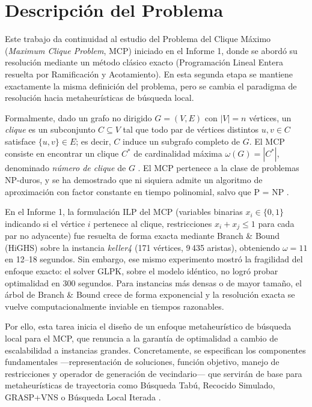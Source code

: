 \documentclass[letterpaper,12pt]{article}
\begin{document}
\section{Descripción del Problema}\label{sec:problema}

Este trabajo da continuidad al estudio del Problema del Clique Máximo (\textit{Maximum Clique Problem}, MCP) iniciado en el Informe 1, donde se abordó su resolución mediante un método clásico exacto (Programación Lineal Entera resuelta por Ramificación y Acotamiento). En esta segunda etapa se mantiene exactamente la misma definición del problema, pero se cambia el paradigma de resolución hacia metaheurísticas de búsqueda local.

Formalmente, dado un grafo no dirigido $G=(V,E)$ con $|V|=n$ vértices, un \emph{clique} es un subconjunto $C \subseteq V$ tal que todo par de vértices distintos $u,v \in C$ satisface $\{u,v\} \in E$; es decir, $C$ induce un subgrafo completo de $G$. El MCP consiste en encontrar un clique $C^*$ de cardinalidad máxima $\omega(G) = |C^*|$, denominado \emph{número de clique} de $G$ \parencite{pardalos1994maximum}. El MCP pertenece a la clase de problemas NP-duros, y se ha demostrado que ni siquiera admite un algoritmo de aproximación con factor constante en tiempo polinomial, salvo que P = NP \parencite{pardalos1994maximum, bomze1999}.

En el Informe 1, la formulación ILP del MCP (variables binarias $x_i \in \{0,1\}$ indicando si el vértice $i$ pertenece al clique, restricciones $x_i+x_j\leq 1$ para cada par no adyacente) fue resuelta de forma exacta mediante Branch \& Bound (HiGHS) sobre la instancia \textit{keller4} (171 vértices, 9\,435 aristas), obteniendo $\omega=11$ en 12--18 segundos. Sin embargo, ese mismo experimento mostró la fragilidad del enfoque exacto: el solver GLPK, sobre el modelo idéntico, no logró probar optimalidad en 300 segundos. Para instancias más densas o de mayor tamaño, el árbol de Branch \& Bound crece de forma exponencial y la resolución exacta se vuelve computacionalmente inviable en tiempos razonables.

Por ello, esta tarea inicia el diseño de un enfoque metaheurístico de búsqueda local para el MCP, que renuncia a la garantía de optimalidad a cambio de escalabilidad a instancias grandes. Concretamente, se especifican los componentes fundamentales —representación de soluciones, función objetivo, manejo de restricciones y operador de generación de vecindario— que servirán de base para metaheurísticas de trayectoria como Búsqueda Tabú, Recocido Simulado, GRASP+VNS o Búsqueda Local Iterada \parencite{battiti2001reactive, pullan2006dynamic, katayama2005effective}.
\end{document}
